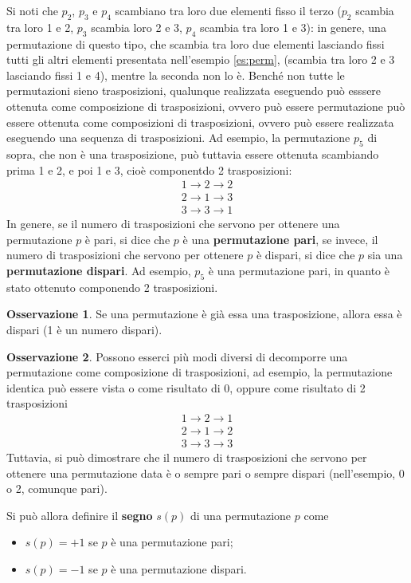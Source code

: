 \documentclass{book}
\theoremstyle{definition}
\newtheorem{oss}{Osservazione}[section]
\theoremstyle{plain}
\begin{document}
Si noti che $p_2$, $p_3$ e $p_4$ scambiano tra loro due elementi fisso il terzo
($p_2$ scambia tra loro 1 e 2, $p_3$ scambia loro 2 e 3, $p_4$ scambia tra loro 1 e
3): in genere, una permutazione di questo tipo, che scambia tra loro due elementi
lasciando fissi tutti gli altri elementi presentata nell'esempio \ref{es:perm},
(scambia tra loro 2 e 3 lasciando fissi 1 e 4), mentre la seconda non lo è. Benché
non tutte le permutazioni sieno trasposizioni, qualunque realizzata eseguendo può
esssere ottenuta come composizione di trasposizioni, ovvero può essere permutazione
può essere ottenuta come composizioni di trasposizioni, ovvero può essere realizzata
eseguendo una sequenza di trasposizioni. Ad esempio, la permutazione $p_5$ di sopra,
che non è una trasposizione, può tuttavia essere ottenuta scambiando prima 1 e 2, e
poi 1 e 3, cioè componentdo 2 trasposizioni:
\begin{equation*}
  \begin{matrix}
    1 \to 2 \to 2\\
    2 \to 1 \to 3\\
    3 \to 3 \to 1
  \end{matrix}
\end{equation*}
In genere, se il numero di trasposizioni che servono per ottenere una permutazione
$p$ è pari, si dice che $p$ è una \textbf{permutazione pari}, se invece, il numero
di trasposizioni che servono per ottenere $p$ è dispari, si dice che $p$ sia una
\textbf{permutazione dispari}. Ad esempio, $p_5$ è una permutazione pari, in quanto
è stato ottenuto componendo 2 trasposizioni.
\begin{oss}
  \label{oss:perm1}
  Se una permutazione è già essa una trasposizione, allora essa è dispari (1 è un
  numero dispari).
\end{oss}
\begin{oss}
  \label{oss:perm2}
  Possono esserci più modi diversi di decomporre una permutazione come composizione
  di trasposizioni, ad esempio, la permutazione identica può essere vista o come
  risultato di $0$, oppure come risultato di 2 trasposizioni
  \begin{equation*}
    \begin{matrix}
      1 \to 2 \to 1\\
      2 \to 1 \to 2\\
      3 \to 3 \to 3
    \end{matrix}
  \end{equation*}
  Tuttavia, si può dimostrare che il numero di trasposizioni che servono per
  ottenere una permutazione data è o sempre pari o sempre dispari (nell'esempio, 0
  o 2, comunque pari).
\end{oss}
Si può allora definire il \textbf{segno} $s(p)$ di una permutazione $p$ come
\begin{itemize}
\item $s(p)=+1$ se $p$ è una permutazione pari;
\item $s(p)=-1$ se $p$ è una permutazione dispari.
\end{itemize}
\end{document}
